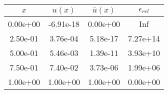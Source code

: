 \begin{tabular}{|c|c|c|c|}
\hline
\textbf{$x$}&\textbf{$u(x)$}&\textbf{$\bar{u}(x)$}&\textbf{$\epsilon_{rel}$}\\\hline
0.00e+00&-6.91e-18&0.00e+00&Inf\\\hline
2.50e-01&3.76e-04&5.18e-17&7.27e+14\\\hline
5.00e-01&5.46e-03&1.39e-11&3.93e+10\\\hline
7.50e-01&7.40e-02&3.73e-06&1.99e+06\\\hline
1.00e+00&1.00e+00&1.00e+00&0.00e+00\\\hline
\end{tabular}
